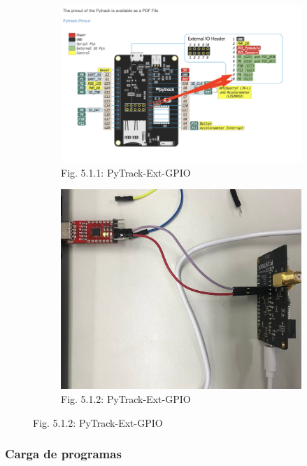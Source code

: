 \documentclass[12pt]{article}
\begin{document}
\begin{figure}[ht]
  \centering
  \begin{subfigure}[b]{0.45\linewidth}
    \includegraphics[width=\linewidth]{images/pytrack-external-gpio.png}
    \caption{Fig. 5.1.1: PyTrack-Ext-GPIO}
  \end{subfigure}
  \begin{subfigure}[b]{0.45\linewidth}
    \includegraphics[width=\linewidth]{images/pytrack-external-gpio-2.png}
    \caption{Fig. 5.1.2: PyTrack-Ext-GPIO}
  \end{subfigure}
\end{figure}

\subsubsection{Carga de programas}
\end{document}
